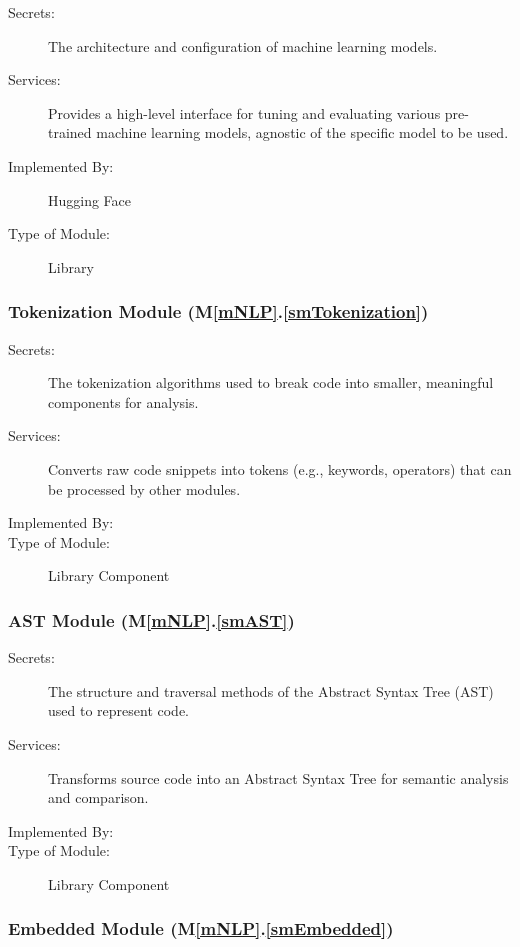 \documentclass[12pt, titlepage]{article}
\newcommand{\smref}[2]{M\ref{#1}.\ref{#2}}
\begin{document}
\begin{description}
\item[Secrets:] The architecture and configuration of machine learning models.
\item[Services:] Provides a high-level interface for tuning and evaluating various pre-trained machine learning models, agnostic of the specific model to be used.
\item[Implemented By:] Hugging Face
\item[Type of Module:] Library
\end{description}

\subsubsection{Tokenization Module (\smref{mNLP}{smTokenization})}

\begin{description}
\item[Secrets:] The tokenization algorithms used to break code into smaller, meaningful components for analysis.
\item[Services:] Converts raw code snippets into tokens (e.g., keywords, operators) that can be processed by other modules.
\item[Implemented By:] \progname{}
\item[Type of Module:] Library Component
\end{description}

\subsubsection{AST Module (\smref{mNLP}{smAST})}

\begin{description}
\item[Secrets:] The structure and traversal methods of the Abstract Syntax Tree (AST) used to represent code.
\item[Services:] Transforms source code into an Abstract Syntax Tree for semantic analysis and comparison.
\item[Implemented By:] \progname{}
\item[Type of Module:] Library Component
\end{description}

\subsubsection{Embedded Module (\smref{mNLP}{smEmbedded})}
\end{document}
